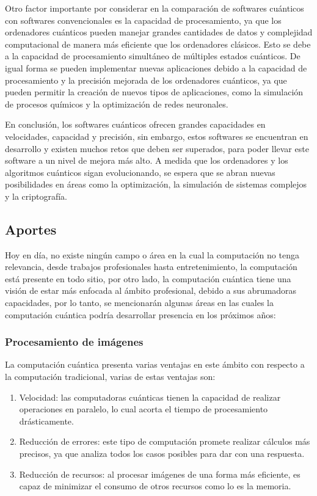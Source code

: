 \documentclass{article}
\begin{document}
Otro factor importante por considerar en la comparación de softwares cuánticos con softwares convencionales es la capacidad de procesamiento, ya que los ordenadores cuánticos pueden manejar grandes cantidades de datos y complejidad computacional de manera más eficiente que los ordenadores clásicos. Esto se debe a la capacidad de procesamiento simultáneo de múltiples estados cuánticos. De igual forma se pueden implementar nuevas aplicaciones debido a la capacidad de procesamiento y la precisión mejorada de los ordenadores cuánticos, ya que pueden permitir la creación de nuevos tipos de aplicaciones, como la simulación de procesos químicos y la optimización de redes neuronales. 

En conclusión, los softwares cuánticos ofrecen grandes capacidades en velocidades, capacidad y precisión, sin embargo, estos softwares se encuentran en desarrollo y existen muchos retos que deben ser superados, para poder llevar este software a un nivel de mejora más alto. A medida que los ordenadores y los algoritmos cuánticos sigan evolucionando, se espera que se abran nuevas posibilidades en áreas como la optimización, la simulación de sistemas complejos y la criptografía. 

\subsection{Aportes}
Hoy en día, no existe ningún campo o área en la cual la computación no tenga relevancia, desde trabajos profesionales hasta entretenimiento, la computación está presente en todo sitio, por otro lado, la computación cuántica tiene una visión de estar más enfocada al ámbito profesional, debido a sus abrumadoras capacidades, por lo tanto, se mencionarán algunas áreas en las cuales la computación cuántica podría desarrollar presencia en los próximos años:

\subsubsection{Procesamiento de imágenes} 
La computación cuántica presenta varias ventajas en este ámbito con respecto a la computación tradicional, varias de estas ventajas son: 
\begin{enumerate}
    \item Velocidad: las computadoras cuánticas tienen la capacidad de realizar operaciones en paralelo, lo cual acorta el tiempo de procesamiento drásticamente.

    \item Reducción de errores: este tipo de computación promete realizar cálculos más precisos, ya que analiza todos los casos posibles para dar con una respuesta.

    \item Reducción de recursos: al procesar imágenes de una forma más eficiente, es capaz de minimizar el consumo de otros recursos como lo es la memoria.
\end{enumerate}
\end{document}
